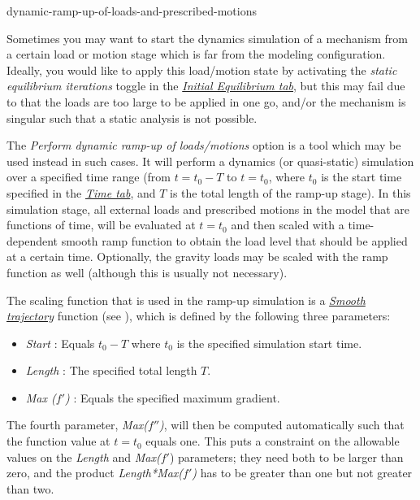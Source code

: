            {dynamic-ramp-up-of-loads-and-prescribed-motions}

Sometimes you may want to start the dynamics simulation of a mechanism from a
certain load or motion stage which is far from the modeling configuration.
Ideally, you would like to apply this load/motion state by activating the
{\sl static equilibrium iterations} toggle in the
\protect\hyperlink{initial-equilibrium-tab}{\sl Initial Equilibrium tab},
but this may fail due to that the loads are too large to be applied in one go,
and/or the mechanism is singular such that a static analysis is not possible.

The {\sl Perform dynamic ramp-up of loads/motions} option is a tool which may be
used instead in such cases. It will perform a dynamics (or quasi-static)
simulation over a specified time range (from $t=t_0-T$ to $t=t_0$, where $t_0$ is
the start time specified in the \protect\hyperlink{time-tab}{\sl Time tab},
and $T$ is the total length of the ramp-up stage).
In this simulation stage, all external loads and prescribed motions in the model
that are functions of time, will be evaluated at $t=t_0$ and then scaled with
a time-dependent smooth ramp function to obtain the load level that should be
applied at a certain time. Optionally, the gravity loads may be scaled with the
ramp function as well (although this is usually not necessary).

The scaling function that is used in the ramp-up simulation is a
\protect\hyperlink{smooth-trajectory}{\sl Smooth trajectory} function
(see ),
which is defined by the following three parameters:

\begin{itemize}
\item{\sl Start} :
  Equals $t_0-T$ where $t_0$ is the specified simulation start time.
\item{\sl Length} :
  The specified total length $T$.
\item{\sl Max ($f'$)} :
  Equals the specified maximum gradient.
\end{itemize}

The fourth parameter, {\sl Max($f''$)}, will then be computed automatically such
that the function value at $t=t_0$ equals one. This puts a constraint on the
allowable values on the {\sl Length} and {\sl Max($f'$}) parameters;
they need both to be larger than zero, and the product
{\sl Length*Max($f'$)} has to be greater than one but not greater than two.

